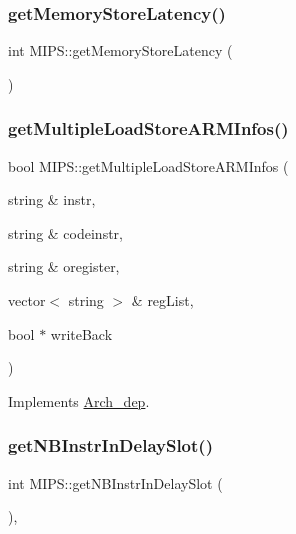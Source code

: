 \subsubsection{\texorpdfstring{get\+Memory\+Store\+Latency()}{getMemoryStoreLatency()}}
{\footnotesize\ttfamily int M\+I\+P\+S\+::get\+Memory\+Store\+Latency (\begin{DoxyParamCaption}{ }\end{DoxyParamCaption})}

\mbox{\label{classMIPS_ae09bc40a4598430935a4deb91e81703c}} 
\subsubsection{\texorpdfstring{get\+Multiple\+Load\+Store\+A\+R\+M\+Infos()}{getMultipleLoadStoreARMInfos()}}
{\footnotesize\ttfamily bool M\+I\+P\+S\+::get\+Multiple\+Load\+Store\+A\+R\+M\+Infos (\begin{DoxyParamCaption}\item[{string \&}]{instr,  }\item[{string \&}]{codeinstr,  }\item[{string \&}]{oregister,  }\item[{vector$<$ string $>$ \&}]{reg\+List,  }\item[{bool $\ast$}]{write\+Back }\end{DoxyParamCaption})\hspace{0.3cm}{\ttfamily [virtual]}}



Implements \hyperlink{classArch__dep_a6d74b532181cea3a40eb28b262a9f6f5}{Arch\+\_\+dep}.

\mbox{\label{classMIPS_a15519e774487809038024a6cc0febab3}} 
\subsubsection{\texorpdfstring{get\+N\+B\+Instr\+In\+Delay\+Slot()}{getNBInstrInDelaySlot()}}
{\footnotesize\ttfamily int M\+I\+P\+S\+::get\+N\+B\+Instr\+In\+Delay\+Slot (\begin{DoxyParamCaption}{ }\end{DoxyParamCaption})\hspace{0.3cm}{\ttfamily [inline]}, {\ttfamily [virtual]}}

